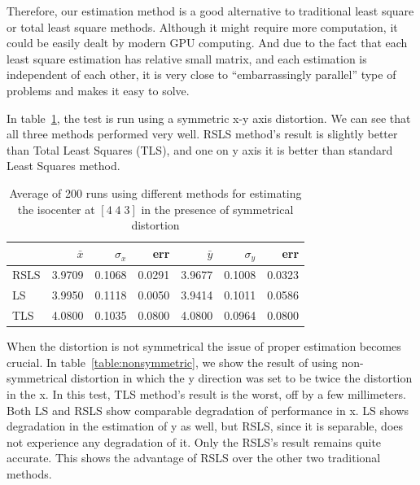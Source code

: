 Therefore, our estimation method is a good alternative to traditional least square or total least square methods. Although it might require more computation, it could be easily dealt by modern GPU computing. And due to the fact that each least square estimation has relative small matrix, and each estimation is independent of each other, it is very close to ``embarrassingly parallel'' type of problems and makes it easy to solve.



In table~\ref{table:symmetric}, the test is run using a symmetric x-y axis distortion. We can see that all three methods performed very well. RSLS method's result is slightly better than Total Least Squares (TLS), and one on y axis it is better than standard Least Squares method.

\begin{table}
  \begin{tabular} {| l | r | r | r | r | r | r |}
    \hline
    & $\bar{x}$ & $\sigma_x$ & err & $\bar{y}$ & $\sigma_y$ & err  \\
    \hline
    RSLS  & 3.9709 & 0.1068  & 0.0291 & 3.9677 & 0.1008 & 0.0323\\
    \hline
    LS & 3.9950 & 0.1118 & 0.0050   & 3.9414 & 0.1011 & 0.0586 \\
    \hline
    TLS  & 4.0800 & 0.1035  & 0.0800   & 4.0800 & 0.0964 & 0.0800 \\
    \hline
  \end{tabular}
  \caption{Average of 200 runs using different methods for estimating the isocenter at $[4 \; 4 \; 3]$ in the presence of symmetrical distortion} 
  \label{table:symmetric}
\end{table}


When the distortion is not symmetrical the issue of proper estimation becomes crucial. In table~\ref{table:nonsymmetric}, we show the result of using non-symmetrical distortion in which the y direction was set to be twice the distortion in the x. In this test, TLS method's result is the worst, off by a few millimeters.  Both LS and RSLS show comparable degradation of performance in x.  LS shows degradation in the estimation of y as well, but RSLS, since it is separable, does not experience any degradation of it. Only the RSLS's result remains quite accurate. This shows the advantage of RSLS over the other two traditional methods.


